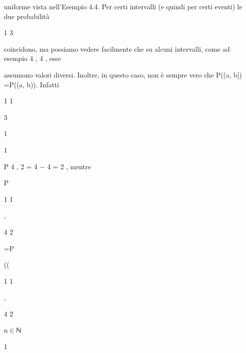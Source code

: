 \documentclass[a4paper,portrait,12pt]{article}
\begin{document}
\begin{flushleft}
uniforme vista nell'Esempio 4.4. Per certi intervalli (e quindi per certi eventi) le due probabilit\`{a}
\end{flushleft}


1 3


\begin{flushleft}
coincidono, ma possiamo vedere facilmente che su alcuni intervalli, come ad esempio 4 , 4 , esse
\end{flushleft}


\begin{flushleft}
assumono valori diversi. Inoltre, in questo caso, non \`{e} sempre vero che P((a, b]) =P((a, b)). Infatti
\end{flushleft}


1 1


3


1


1


\begin{flushleft}
P 4 , 2 = 4 $-$ 4 = 2 , mentre
\end{flushleft}


\begin{flushleft}
P
\end{flushleft}





1 1


,


4 2





\begin{flushleft}
=P
\end{flushleft}





((





1 1


,


4 2





\begin{flushleft}
n$\in$ℕ
\end{flushleft}





1
\end{document}
